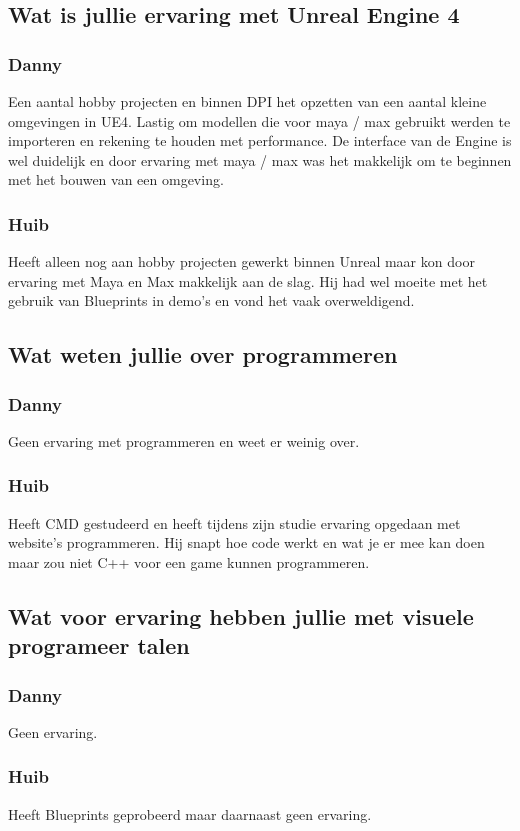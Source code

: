 \subsection*{Wat is jullie ervaring met Unreal Engine 4}
\subsubsection*{Danny}
Een aantal hobby projecten en binnen DPI het opzetten van een aantal kleine omgevingen in UE4. Lastig om modellen die voor maya / max gebruikt werden te importeren en rekening te houden met performance. De interface van de Engine is wel duidelijk en door ervaring met maya / max was het makkelijk om te beginnen met het bouwen van een omgeving.
\subsubsection*{Huib}
Heeft alleen nog aan hobby projecten gewerkt binnen Unreal maar kon door ervaring met Maya en Max makkelijk aan de slag. Hij had wel moeite met het gebruik van Blueprints in demo’s en vond het vaak overweldigend.
\subsection*{Wat weten jullie over programmeren}
\subsubsection*{Danny}
Geen ervaring met programmeren en weet er weinig over.
\subsubsection*{Huib}
Heeft CMD gestudeerd en heeft tijdens zijn studie ervaring opgedaan met website’s programmeren. Hij snapt hoe code werkt en wat je er mee kan doen maar zou niet C++ voor een game kunnen programmeren.
\subsection*{Wat voor ervaring hebben jullie met visuele programeer talen}
\subsubsection*{Danny}
Geen ervaring.
\subsubsection*{Huib}
Heeft Blueprints geprobeerd maar daarnaast geen ervaring.

